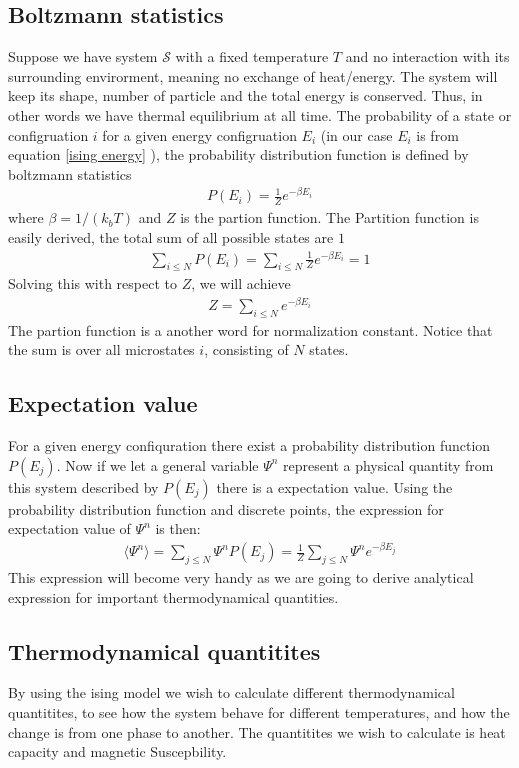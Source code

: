 \documentclass[a4paper, 10pt]{article}
\begin{document}
\subsection{Boltzmann statistics} Suppose we have system $\mathcal{S}$ with a fixed temperature
$T$ and no interaction with its surrounding envirorment, meaning no
exchange of heat/energy. The system will keep its shape, number of particle and the total energy is conserved.
Thus, in other words we have thermal equilibrium at all time. The probability of a state or configruation $i$
for a given energy configruation $E_{i}$ (in our case $E_{i}$ is from equation
\eqref{ising energy} ), the probability distribution function is defined by
boltzmann statistics
\begin{align}
  P(E_{i}) = \frac{1}{Z}e^{-\beta E_{i}}
  \label{prob dens}
\end{align}
where $\beta = 1/(k_{b}T)$ and $Z$ is the partion function. The Partition function is easily derived, the total sum of all possible states are $1$
\begin{align}
  \sum_{i \le N} P(E_{i}) =  \sum_{i\le N} \frac{1}{Z}e^{-\beta E_{i}} = 1
\end{align}
Solving this with respect to $Z$, we will achieve
\begin{align}
  Z = \sum_{i\le N} e^{-\beta E_{i}}
\end{align}
The partion function is a another word for normalization constant. Notice that the
sum is over all microstates $i$, consisting of $N$ states.
\subsection{Expectation value} For a given energy confiquration there exist a probability distribution function $P(E_{j})$. Now if we let a general variable
$\Psi^{n}$ represent a physical quantity from this system described by $P(E_{j})$ there is
a expectation value. Using the probability distribution function and discrete points, the expression
for expectation value of $\Psi^{n}$ is then:
\begin{align}
  \langle \Psi^{n} \rangle = \sum_{j \le N} \Psi^{n}P(E_{j}) = \frac{1}{Z}\sum_{j \le N} \Psi^{n}
  e^{-\beta E_{j}}
  \label{expect val}
\end{align}
This expression will become very handy as we are going to derive analytical expression for
important thermodynamical quantities.

\subsection{Thermodynamical quantitites} By using the ising model we wish to
calculate different thermodynamical quantitites, to see how the system behave for different temperatures,
and how the change is from one phase to another.
The quantitites we wish to calculate is heat capacity and magnetic Suscepbility.
\end{document}
